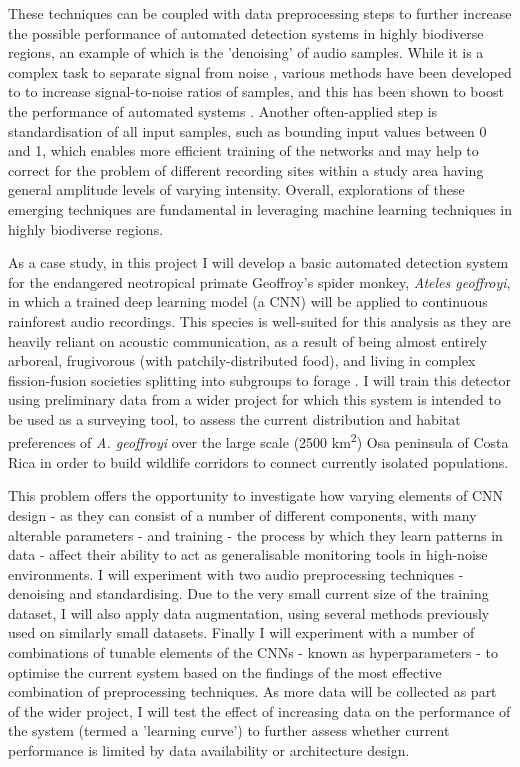 \documentclass[11pt]{article}
\begin{document}
These techniques can be coupled with data preprocessing steps to further increase the possible performance of automated detection systems in highly biodiverse regions, an example of which is the 'denoising' of audio samples. While it is a complex task to separate signal from noise \citep{ovaskainen2018animal}, various methods have been developed to to increase signal-to-noise ratios of samples, and this has been shown to boost the performance of automated systems \citep{stowell2016bird}. Another often-applied step is standardisation of all input samples, such as bounding input values between 0 and 1, which enables more efficient training of the networks and may help to correct for the problem of different recording sites within a study area having general amplitude levels of varying intensity. Overall, explorations of these emerging techniques are fundamental in leveraging machine learning techniques in highly biodiverse regions.

As a case study, in this project I will develop a basic automated detection system for the endangered neotropical primate Geoffroy’s spider monkey, \textit{Ateles geoffroyi}, in which a trained deep learning model (a CNN) will be applied to continuous rainforest audio recordings. This species is well-suited for this analysis as they are heavily reliant on acoustic communication, as a result of being almost entirely arboreal, frugivorous (with patchily-distributed food), and living in complex fission-fusion societies splitting into subgroups to forage \citep{ramos2008communication}. I will train this detector using preliminary data from a wider project for which this system is intended to be used as a surveying tool, to assess the current distribution and habitat preferences of \textit{A. geoffroyi} over the large scale (2500 km\textsuperscript{2}) Osa peninsula of Costa Rica in order to build wildlife corridors to connect currently isolated populations. 

This problem offers the opportunity to investigate how varying elements of CNN design - as they can consist of a number of different components, with many alterable parameters - and training - the process by which they learn patterns in data - affect their ability to act as generalisable monitoring tools in high-noise environments. I will experiment with two audio preprocessing techniques - denoising and standardising. Due to the very small current size of the training dataset, I will also apply data augmentation, using several methods previously used on similarly small datasets. Finally I will experiment with a number of combinations of tunable elements of the CNNs - known as hyperparameters - to optimise the current system based on the findings of the most effective combination of preprocessing techniques. As more data will be collected as part of the wider project, I will test the effect of increasing data on the performance of the system (termed a 'learning curve') to further assess whether current performance is limited by data availability or architecture design.
	
\end{document}
